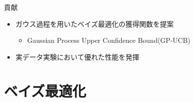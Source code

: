 \documentclass[dvipdfmx, 10.5pt]{beamer}
\begin{document}
\begin{frame}{\insertsubsection}

		\begin{block}{貢献}
			\begin{itemize}
				\item ガウス過程を用いたベイズ最適化の獲得関数を提案
				\begin{itemize}
					\vspace{3pt}
					\item Gaussian Process Upper Confidence Bound(GP-UCB)
				\end{itemize}
				\vspace{9pt}
				\item 実データ実験において優れた性能を発揮
			\end{itemize}
		\end{block}



\end{frame}

\section{ベイズ最適化}
\end{document}
